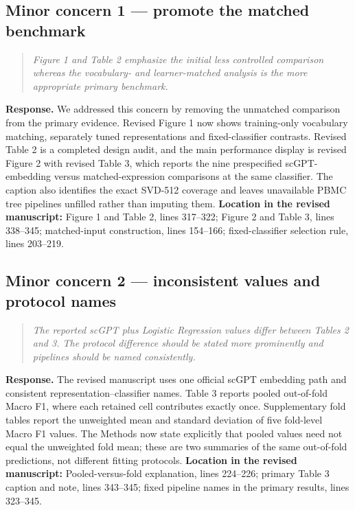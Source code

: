 \documentclass[10pt,a4paper]{article}
\newcommand{\commenttext}[1]{\begin{quote}\colorbox{gray!15}{\parbox{0.91\linewidth}{\itshape #1}}\end{quote}}
\begin{document}
\subsection*{Minor concern 1 --- promote the matched benchmark}

\commenttext{Figure 1 and Table 2 emphasize the initial less controlled comparison whereas the vocabulary- and learner-matched analysis is the more appropriate primary benchmark.}

\textcolor{responseblue}{\textbf{Response.}} We addressed this concern by removing the unmatched comparison from the primary evidence. Revised Figure 1 now shows training-only vocabulary matching, separately tuned representations and fixed-classifier contrasts. Revised Table 2 is a completed design audit, and the main performance display is revised Figure 2 with revised Table 3, which reports the nine prespecified scGPT-embedding versus matched-expression comparisons at the same classifier. The caption also identifies the exact SVD-512 coverage and leaves unavailable PBMC tree pipelines unfilled rather than imputing them. \textbf{Location in the revised manuscript:} Figure 1 and Table 2, lines 317--322; Figure 2 and Table 3, lines 338--345; matched-input construction, lines 154--166; fixed-classifier selection rule, lines 203--219.


\subsection*{Minor concern 2 --- inconsistent values and protocol names}

\commenttext{The reported scGPT plus Logistic Regression values differ between Tables 2 and 3. The protocol difference should be stated more prominently and pipelines should be named consistently.}

\textcolor{responseblue}{\textbf{Response.}} The revised manuscript uses one official scGPT embedding path and consistent representation--classifier names. Table 3 reports pooled out-of-fold Macro F1, where each retained cell contributes exactly once. Supplementary fold tables report the unweighted mean and standard deviation of five fold-level Macro F1 values. The Methods now state explicitly that pooled values need not equal the unweighted fold mean; these are two summaries of the same out-of-fold predictions, not different fitting protocols. \textbf{Location in the revised manuscript:} Pooled-versus-fold explanation, lines 224--226; primary Table 3 caption and note, lines 343--345; fixed pipeline names in the primary results, lines 323--345.
\end{document}
